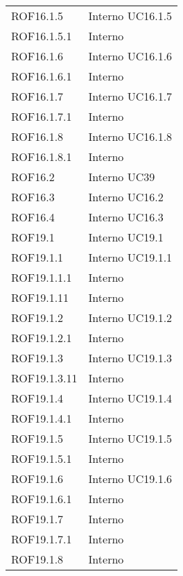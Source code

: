 \begin{longtable}{p{2.5cm}!{\VRule[1pt]}p{2.5cm}}
	ROF16.1.5 & Interno \newline UC16.1.5
	\\
	ROF16.1.5.1 & Interno \\
	ROF16.1.6 & Interno \newline UC16.1.6
	\\
	ROF16.1.6.1 & Interno \\
	ROF16.1.7 & Interno \newline UC16.1.7
	\\
	ROF16.1.7.1 & Interno \\
	ROF16.1.8 & Interno \newline UC16.1.8
	\\
	ROF16.1.8.1 & Interno \\
	ROF16.2 & Interno \newline UC39
	\\
	ROF16.3 & Interno \newline UC16.2
	\\
	ROF16.4 & Interno \newline UC16.3
	\\
	ROF19.1 & Interno \newline UC19.1
	\\
	ROF19.1.1 & Interno \newline UC19.1.1
	\\
	ROF19.1.1.1 & Interno \\
	ROF19.1.11 & Interno \\
	ROF19.1.2 & Interno \newline UC19.1.2
	\\
	ROF19.1.2.1 & Interno \\
	ROF19.1.3 & Interno \newline UC19.1.3
	\\
	ROF19.1.3.11 & Interno \\
	ROF19.1.4 & Interno \newline UC19.1.4
	\\
	ROF19.1.4.1 & Interno \\
	ROF19.1.5 & Interno \newline UC19.1.5
	\\
	ROF19.1.5.1 & Interno \\
	ROF19.1.6 & Interno \newline UC19.1.6
	\\
	ROF19.1.6.1 & Interno \\
	ROF19.1.7 & Interno \\
	ROF19.1.7.1 & Interno \\
	ROF19.1.8 & Interno \\

\end{longtable}
